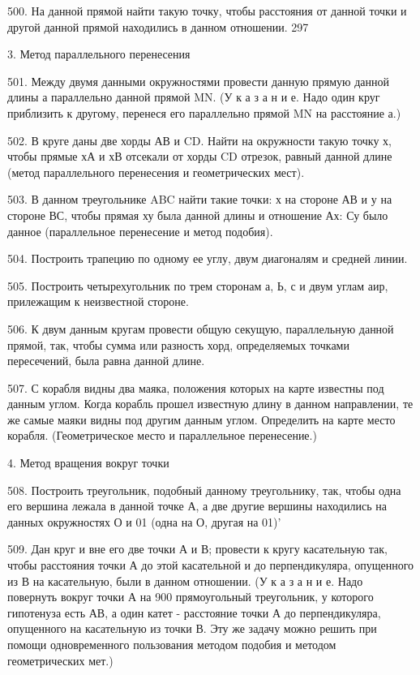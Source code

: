 {500.                      На данной прямой найти такую точку, чтобы расстояния от данной точки и другой данной прямой находились в данном отношении.
297

3. Метод параллельного перенесения

501.                      Между двумя данными окружностями провести данную прямую данной длины а параллельно данной прямой MN. (У к а з а н и е. Надо один круг приблизить к другому, перенеся его параллельно прямой MN на расстояние а.)

502.                      В круге даны две хорды АВ и CD. Найти на окружности такую точку х, чтобы прямые хА и хВ отсекали от хорды CD отрезок, равный данной длине (метод параллельного перенесения и геометрических мест).

503.                        В данном треугольнике ABC найти такие точки: х на стороне АВ и у на стороне ВС, чтобы прямая ху была данной длины и отношение Ах: Су было данное (параллельное перенесение и метод подобия).

504.                      Построить трапецию по одному ее углу, двум диагоналям и средней линии.

505.                      Построить четырехугольник по трем сторонам а, Ь, с и двум углам аир, прилежащим к неизвестной стороне.

506.                     К двум данным кругам провести общую секущую, параллельную данной прямой, так, чтобы сумма или разность хорд, определяемых точками пересечений, была равна данной длине.

507.                        С корабля видны два маяка, положения которых на карте известны под данным углом. Когда корабль прошел известную длину в данном направлении, те же самые маяки видны под другим данным углом. Определить на карте место корабля. (Геометрическое место и параллельное перенесение.)

4. Метод вращения вокруг точки

508.                     Построить треугольник, подобный данному треугольнику, так, чтобы одна его вершина лежала в данной точке А, а две другие вершины находились на данных окружностях О и 01 (одна на О, другая на 01)'

509.                     Дан круг и вне его две точки А и В; провести к кругу касательную так, чтобы расстояния точки А до этой касательной и до перпендикуляра, опущенного из В на касательную, были в данном отношении. (У к а з а н и е. Надо повернуть вокруг точки А на 900 прямоугольный треугольник, у которого гипотенуза есть АВ, а один катет - расстояние точки А до перпендикуляра, опущенного на касательную из точки В.
Эту же задачу можно решить при помощи одновременного пользования методом подобия и методом геометрических мет.)

}
